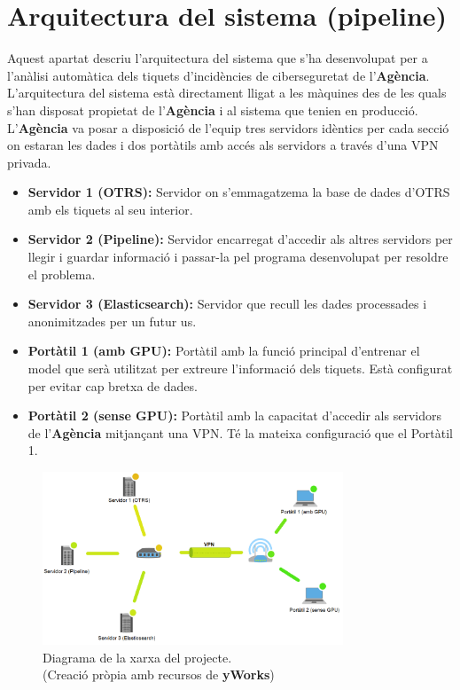 \section{Arquitectura del sistema (pipeline)}
Aquest apartat descriu l'arquitectura del sistema que s'ha desenvolupat per a l'anàlisi automàtica dels tiquets d'incidències de ciberseguretat de l'\textbf{Agència}. L'arquitectura del sistema està directament lligat a les màquines des de les quals s'han disposat propietat de l'\textbf{Agència} i al sistema que tenien en producció. L'\textbf{Agència} va posar a disposició de l'equip tres servidors idèntics per cada secció on estaran les dades i dos portàtils amb accés als servidors a través d'una VPN privada.

\begin{itemize}
     \item \textbf{Servidor 1 (OTRS):} Servidor on s'emmagatzema la base de dades d'OTRS amb els tiquets al seu interior.
     \item \textbf{Servidor 2 (Pipeline):} Servidor encarregat d'accedir als altres servidors per llegir i guardar informació i passar-la pel programa desenvolupat per resoldre el problema.
     \item \textbf{Servidor 3 (Elasticsearch):} Servidor que recull les dades processades i anonimitzades per un futur us.
\end{itemize}

\begin{itemize}
     \item \textbf{Portàtil 1 (amb GPU):} Portàtil amb la funció principal d'entrenar el model que serà utilitzat per extreure l'informació dels tiquets. Està configurat per evitar cap bretxa de dades.
     \item \textbf{Portàtil 2 (sense GPU):} Portàtil amb la capacitat d'accedir als servidors de l'\textbf{Agència} mitjançant una VPN. Té la mateixa configuració que el Portàtil 1.
\end{itemize}

\begin{figure}[H]
     \centering
     \includegraphics[width=0.8\textwidth]{network.png}
     \caption{Diagrama de la xarxa del projecte. \\ (Creació pròpia amb recursos de \textbf{yWorks})}
     \label{fig:network}
\end{figure}

